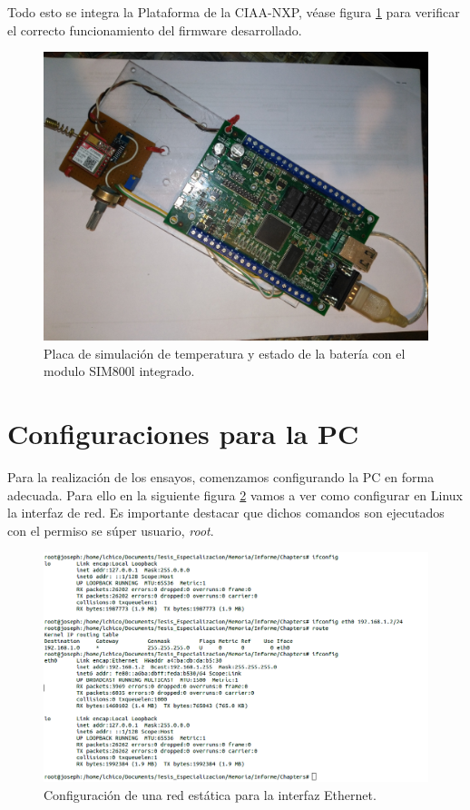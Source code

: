 Todo esto se integra la Plataforma de la CIAA-NXP, véase figura \ref{fig:prototipo} para verificar el correcto funcionamiento del firmware desarrollado.

\begin{figure}[h]
  \centering
  \includegraphics[scale=.04]{./Figures/prototipo.jpg}
  \caption{Placa de simulación de temperatura y estado de la batería con el modulo SIM800l integrado.}
  \label{fig:prototipo}
\end{figure}

\section{Configuraciones para la PC}

Para la realización de los ensayos, comenzamos configurando la PC en forma adecuada. Para ello en la siguiente figura \ref{fig:hw_pc} vamos a ver como configurar en Linux la interfaz de red. Es importante destacar que dichos comandos son ejecutados con el permiso se súper usuario, \emph{root}.

\begin{figure}[h]
  \centering
  \includegraphics[scale=.35]{./Figures/config_net_console.png}
  \caption{Configuración de una red estática para la interfaz Ethernet.}
  \label{fig:hw_pc}
\end{figure}

